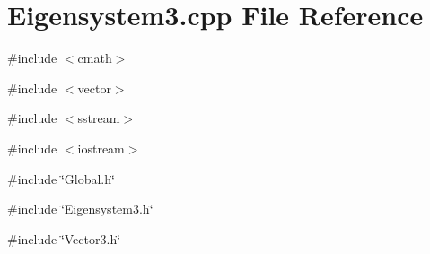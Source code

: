 \section{Eigensystem3.cpp File Reference}
\label{Eigensystem3_8cpp}
{\ttfamily \#include $<$cmath$>$}\par
{\ttfamily \#include $<$vector$>$}\par
{\ttfamily \#include $<$sstream$>$}\par
{\ttfamily \#include $<$iostream$>$}\par
{\ttfamily \#include \char`\"{}Global.h\char`\"{}}\par
{\ttfamily \#include \char`\"{}Eigensystem3.h\char`\"{}}\par
{\ttfamily \#include \char`\"{}Vector3.h\char`\"{}}\par

